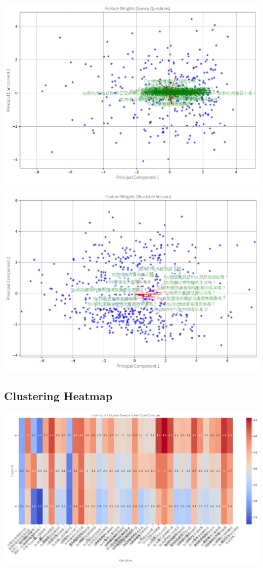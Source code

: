 \documentclass[
  letterpaper,
  DIV=11,
  numbers=noendperiod]{scrartcl}
\begin{document}
\includegraphics{_thesis_files/figure-pdf/cell-81-output-3.pdf}

\includegraphics{_thesis_files/figure-pdf/cell-81-output-4.pdf}

\subsection{Clustering Heatmap}\label{clustering-heatmap}

\includegraphics{_thesis_files/figure-pdf/cell-82-output-1.pdf}
\end{document}
